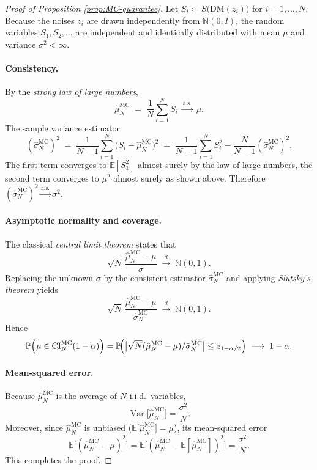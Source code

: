 \documentclass[12pt]{article}
\newcommand{\0}{\mathbf{0}}
\newcommand{\bE}{\mathbb{E}}
\newcommand{\bN}{\mathbb{N}}
\newcommand{\bP}{\mathbb{P}}
\newcommand{\DM}{\text{DM}}
\newcommand{\MC}{\text{MC}}
\newcommand{\CI}{\text{CI}}
\DeclareMathOperator{\Var}{Var}
\begin{document}
\begin{proof}[Proof of Proposition \ref{prop:MC-guarantee}]
Let $S_i \coloneq S\!\bigl(\DM(z_i)\bigr)$ for $i=1,\dots,N$.  
Because the noises $z_i$ are drawn independently from $\bN(0,I)$, the random variables $S_1,S_2,\dots$ are independent and identically distributed with mean $\mu$ and variance $\sigma^{2}<\infty$.

\paragraph{Consistency.}
By the \emph{strong law of large numbers},
\[
\hat\mu_N^\MC \;=\;\frac1N\sum_{i=1}^N S_i
\;\xrightarrow{\text{a.s.}}\;\mu .
\]
The sample variance estimator
\[
(\hat\sigma_N^\MC)^2
\;=\;
\frac1{N-1}\sum_{i=1}^N\!\bigl(S_i-\hat\mu_N^\MC\bigr)^{2}
\;=\; \frac1{N-1}\sum_{i=1}^N S_i^2 - \frac{N}{N-1} (\hat\sigma_N^\MC)^2.
\]
The first term converges to $\bE[S_1^2]$ almost surely by the law of large numbers, the second term converges to $\mu^2$ almost surely as shown above. Therefore 
$(\hat\sigma_N^\MC)^2\xrightarrow{\text{a.s.}}\sigma^{2}$.

\paragraph{Asymptotic normality and coverage.}
The classical \emph{central limit theorem} states that
\[
\sqrt{N}\,\frac{\hat\mu_N^\MC-\mu}{\sigma}
\;\xrightarrow{d}\;
\bN(0,1).
\]
Replacing the unknown $\sigma$ by the consistent estimator $\hat\sigma_N^\MC$ and applying \emph{Slutsky’s theorem} yields
\[
\sqrt{N}\,\frac{\hat\mu_N^\MC-\mu}{\hat\sigma_N^\MC}
\;\xrightarrow{d}\;
\bN(0,1).
\]
Hence
\[
\bP\!\left(
\mu\in\CI_N^\MC(1-\alpha)
\right)
=
\bP\!\Bigl(
\bigl|\sqrt{N}(\hat\mu_N^\MC-\mu)/\hat\sigma_N^\MC\bigr|
\le z_{1-\alpha/2}
\Bigr)
\;\longrightarrow\;
1-\alpha .
\]

\paragraph{Mean‐squared error.}
Because $\hat\mu_N^\MC$ is the average of $N$ i.i.d.\ variables,
\[
\Var\!\bigl[\hat\mu_N^\MC\bigr]
= \frac{\sigma^{2}}{N}.\]
Moreover, since $\hat\mu_N^\MC$ is unbiased  ($\bE\!\bigl[\hat\mu_N^\MC\bigr] =\mu$), its mean-squared error 
\[
\bE\bigl[(\hat\mu_N^\MC-\mu)^{2}\bigr] 
=
\bE\bigl[(\hat\mu_N^\MC-\bE[\hat\mu_N^\MC])^{2}\bigr] 
=
\frac{\sigma^{2}}{N}.
\]
This completes the proof. \qedhere
\end{proof}
\end{document}
